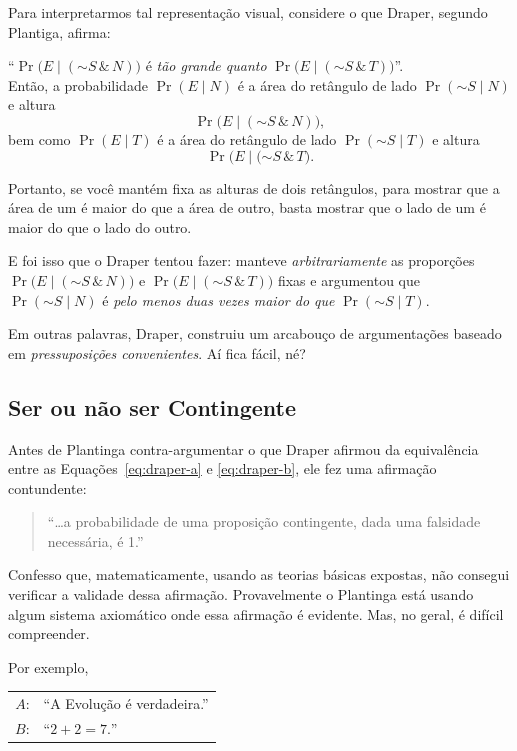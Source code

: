 \documentclass[12pt]{article}
\theoremstyle{definition}
\newcommand{\N}{\ensuremath{\sim\!}}
\begin{document}
		Para interpretarmos tal representação visual, considere o que Draper, segundo
		Plantiga, afirma:
		
		\vspace{0.3cm}
		\footnotesize
		\noindent``$\Pr{\big(E\mid (\N S \,\&\, N)\big)}$
		é \textit{tão grande quanto}
		$\Pr{\big(E\mid (\N S \,\&\, T)\big)}$''.
		\normalsize\\
		
		Então, a probabilidade $\Pr{(E\mid N)}$ é a área do retângulo de lado
		$\Pr{(\N S \mid N)}$ e altura \[\Pr{\big(E\mid (\N S \,\&\, N)\big)},\] bem como
		$\Pr{(E\mid T)}$ é a área do retângulo de lado
		$\Pr{(\N S \mid T)}$ e altura \[\Pr{\big(E\mid (\N S \,\&\, T\big)}.\]
		
		Portanto, se você mantém fixa as alturas de dois retângulos, para mostrar que 
		a área de um é maior do que a área de outro, basta mostrar que o lado de um
		é maior do que o lado do outro.
		
		E foi isso que o Draper tentou fazer: manteve \textit{arbitrariamente} as
		proporções $\Pr{\big(E\mid (\N S \,\&\, N)\big)}$ e 
		$\Pr{\big(E\mid (\N S \,\&\, T)\big)}$ fixas e argumentou que\\
		$\Pr{(\N S \mid N)}$ é \textit{pelo menos duas vezes maior do que} 
		$\Pr{(\N S \mid T)}$.
		
		Em outras palavras, Draper, construiu um arcabouço de argumentações baseado
		em \textit{pressuposições convenientes}.
		Aí fica fácil, né?
		
		\subsection{Ser ou não ser Contingente}
		Antes de Plantinga contra-argumentar o que Draper afirmou da equivalência 
		entre as Equações~\eqref{eq:draper-a} e \eqref{eq:draper-b}, ele fez uma 
		afirmação contundente:
		
		\begin{quote}
		 ``\ldots a probabilidade de uma proposição contingente, dada uma falsidade 
			necessária, é 1.''
		\end{quote}
		
		Confesso que, matematicamente, usando as teorias básicas expostas, não 
		consegui verificar a validade dessa afirmação.
		Provavelmente o Plantinga está usando algum sistema axiomático onde essa 
		afirmação é evidente.
		Mas, no geral, é difícil compreender.
		
		Por exemplo, 
		
		\begin{tabular}{rl}
		 $A$: & ``A Evolução é verdadeira.''\\
			$B$: & ``$2 + 2 = 7.$''
		\end{tabular}
		
\end{document}

